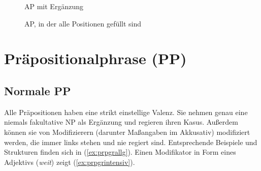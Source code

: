 \begin{figure}
  \centering
  \caption{AP mit Ergänzung}
  \label{fig:erginadjgr}
\end{figure}

\begin{figure}
  \centering
  \caption{AP, in der alle Positionen gefüllt sind}
  \label{fig:adjgrziemlichvoll}
\end{figure}

\section{Präpositionalphrase (PP)}

\label{sec:prpgr}

\subsection{Normale PP}



Alle Präpositionen haben eine strikt einstellige Valenz.
Sie nehmen genau eine niemals fakultative NP als Ergänzung und regieren ihren Kasus.
Außerdem können sie von Modifizierern (darunter Maßangaben im Akkusativ) modifiziert werden, die immer links stehen und nie regiert sind.
Entsprechende Beispiele und Strukturen finden sich in (\ref{ex:prpgrallg}).
Einen Modifikator in Form eines Adjektivs (\textit{weit}) zeigt (\ref{ex:prpgrintensiv}).

